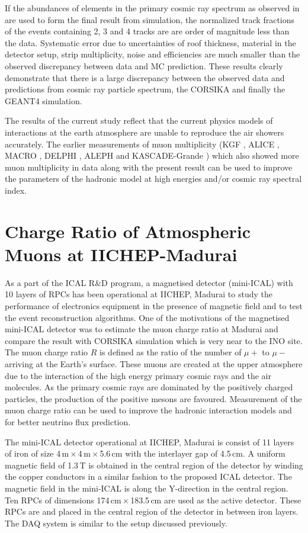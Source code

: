 \documentclass[a4paper,12pt,twoside,openany]{article}
\begin{document}
If the abundances of elements in the primary cosmic ray spectrum as
observed in \cite{cosmic1} are used to form the final
result from simulation, the normalized track fractions of the events
containing 2, 3 and 4 tracks are are order of magnitude less than the
data. Systematic error due to uncertainties of roof thickness,
material in the detector setup, strip multiplicity, noise and
efficiencies are much smaller than the observed discrepancy between
data and MC prediction. These results clearly demonstrate that there
is a large discrepancy between the observed data and predictions from
cosmic ray particle spectrum, the CORSIKA and finally the GEANT4
simulation.

The results of the current study reflect that the current physics
models of interactions at the earth atmosphere are unable to reproduce
the air showers accurately. The earlier measurements of muon
multiplicity (KGF \cite{kgf1}, ALICE \cite{alice1}, MACRO
\cite{macro1}, DELPHI \cite{delphi1}, ALEPH \cite{aleph1} and
KASCADE-Grande \cite{kascade1}) which also showed more muon
multiplicity in data along with the present result can be used to
improve the parameters of the hadronic model at high energies and/or
cosmic ray spectral index.

\section{Charge Ratio of Atmospheric Muons at IICHEP-Madurai}

As a part of the ICAL R\&D program, a magnetised detector (mini-ICAL)
with 10 layers of RPCs has been operational at IICHEP, Madurai to
study the performance of electronics equipment in the presence of
magnetic field and to test the event reconstruction algorithms. One of
the motivations of the magnetised mini-ICAL detector was to estimate
the muon charge ratio at Madurai and compare the result with CORSIKA
simulation which is very near to the INO site. The muon charge ratio
$R$ is defined as the ratio of the number of $\mu+$ to $\mu-$ arriving
at the Earth's surface. These muons are created at the upper
atmosphere due to the interaction of the high energy primary cosmic
rays and the air molecules. As the primary cosmic rays are dominated
by the positively charged particles, the production of the positive
mesons are favoured. Measurement of the muon charge ratio can be used
to improve the hadronic interaction models and for better neutrino
flux prediction.

The mini-ICAL detector operational at IICHEP, Madurai is consist of 11
layers of iron of size 4\,m\,$\times$\,4\,m\,$\times$\,5.6\,cm with
the interlayer gap of 4.5\,cm. A uniform magnetic field of 1.3\,T is
obtained in the central region of the detector by winding the copper
conductors in a similar fashion to the proposed ICAL detector. The
magnetic field in the mini-ICAL is along the Y-direction in the
central region. Ten RPCs of dimensions 174\,cm\,$\times$\,183.5\,cm
are used as the active detector. These RPCs are and placed in the
central region of the detector in between iron layers. The DAQ system
is similar to the setup discussed previously.
\end{document}
